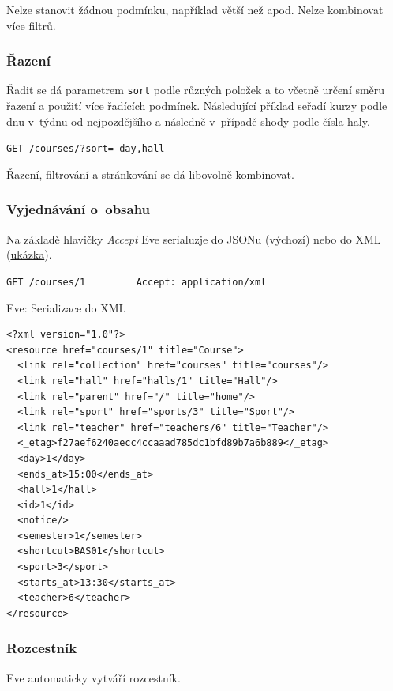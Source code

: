 Nelze stanovit žádnou podmínku, například větší než apod. Nelze kombinovat více filtrů.

\subsubsection*{Řazení}\label{ux159azenuxed}

Řadit se dá parametrem \verb!sort! podle různých položek a to včetně určení směru řazení a použití více řadících podmínek. Následující příklad seřadí kurzy podle dnu v~týdnu od nejpozdějšího a následně v~případě shody podle čísla haly.

\verb!GET /courses/?sort=-day,hall!

Řazení, filtrování a stránkování se dá libovolně kombinovat.

\subsubsection*{Vyjednávání o~obsahu}\label{vyjednuxe1vuxe1nuxed-o-obsahu}

Na základě hlavičky \emph{Accept} Eve serialuzje do JSONu (výchozí) nebo do XML (\protect\hyperlink{code:eve:xml}{ukázka}).

\verb!GET /courses/1         Accept: application/xml!

\begin{listing}[htbp]
\caption{{\label{code:eve:xml}Eve: Serializace do XML}}
\begin{verbatim}
<?xml version="1.0"?>
<resource href="courses/1" title="Course">
  <link rel="collection" href="courses" title="courses"/>
  <link rel="hall" href="halls/1" title="Hall"/>
  <link rel="parent" href="/" title="home"/>
  <link rel="sport" href="sports/3" title="Sport"/>
  <link rel="teacher" href="teachers/6" title="Teacher"/>
  <_etag>f27aef6240aecc4ccaaad785dc1bfd89b7a6b889</_etag>
  <day>1</day>
  <ends_at>15:00</ends_at>
  <hall>1</hall>
  <id>1</id>
  <notice/>
  <semester>1</semester>
  <shortcut>BAS01</shortcut>
  <sport>3</sport>
  <starts_at>13:30</starts_at>
  <teacher>6</teacher>
</resource>
\end{verbatim}
\end{listing}

\subsubsection*{Rozcestník}\label{rozcestnuxedk}

Eve automaticky vytváří rozcestník.

